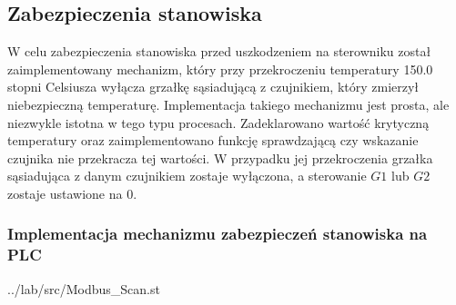 \subsection{Zabezpieczenia stanowiska}
\label{lab:zad2}

W	celu	zabezpieczenia	stanowiska	przed	uszkodzeniem	na	sterowniku	został	
zaimplementowany	mechanizm,	który	przy	przekroczeniu	temperatury	\num{150.0} stopni Celsiusza 
wyłącza	grzałkę	sąsiadującą	z	czujnikiem,	który	zmierzył	niebezpieczną	
temperaturę.	
\newline
Implementacja	takiego	mechanizmu	jest	prosta,	ale	niezwykle	
istotna	w	tego	typu	procesach.	
\newline
Zadeklarowano	wartość	krytyczną	temperatury	
oraz	zaimplementowano	funkcję	sprawdzającą	czy	wskazanie	czujnika	nie	
przekracza	tej	wartości. W	przypadku	jej	przekroczenia	grzałka	sąsiadująca	z	
danym	czujnikiem	zostaje	wyłączona, a	sterowanie	$G1$ lub $G2$	zostaje	ustawione	na	\num{0}.

\subsubsection{Implementacja mechanizmu zabezpieczeń stanowiska na PLC}

\ifdefined\CompileListings
    
        {../lab/src/Modbus_Scan.st}
    \newpage
\fi


\newpage
